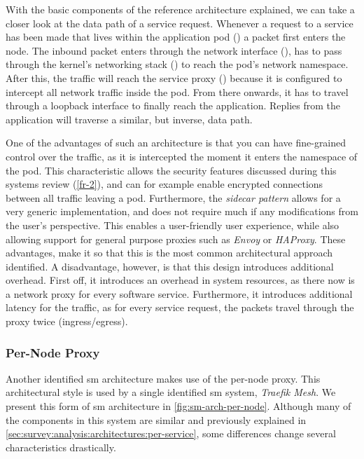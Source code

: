 With the basic components of the reference architecture explained, we can take a closer look at the data path of a service request. Whenever a request to a service has been made that lives within the application pod () a packet first enters the node. The inbound packet enters through the network interface (), has to pass through the kernel's networking stack () to reach the \gls{pod}'s network namespace. After this, the traffic will reach the service proxy () because it is configured to intercept all network traffic inside the pod. From there onwards, it has to travel through a loopback interface to finally reach the application. Replies from the application will traverse a similar, but inverse, data path.

One of the advantages of such an architecture is that you can have fine-grained control over the traffic, as it is intercepted the moment it enters the namespace of the \gls{pod}. This characteristic allows the security features discussed during this systems review (\ref{fr-2}), and can for example enable encrypted connections between all traffic leaving a \gls{pod}. Furthermore, the \textit{sidecar pattern} allows for a very generic implementation, and does not require much if any modifications from the user's perspective. This enables a user-friendly user experience, while also allowing support for general purpose proxies such as \textit{Envoy} or \textit{HAProxy}. These advantages, make it so that this is the most common architectural approach identified. A disadvantage, however, is that this design introduces additional overhead. First off, it introduces an overhead in system resources, as there now is a network proxy for every software service. Furthermore, it introduces additional latency for the traffic, as for every service request, the packets travel through the proxy twice (ingress/egress).


\subsubsection{Per-Node Proxy}
\label{sec:survey:analysis:architectures:per-node}

Another identified \gls{sm} architecture makes use of the per-node proxy. This architectural style is used by a single identified \gls{sm} system, \textit{Traefik Mesh}. We present this form of \gls{sm} architecture in \cref{fig:sm-arch-per-node}. Although many of the components in this system are similar and previously explained in \cref{sec:survey:analysis:architectures:per-service}, some differences change several characteristics drastically.

